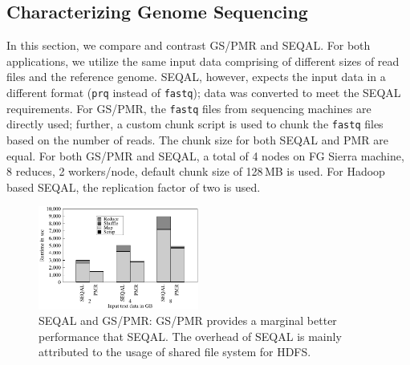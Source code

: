\documentclass{acm_proc_article-sp}
\newcommand{\jhanote}[1]{ {\textcolor{red} { ***SJ: #1 }}}
\newcommand{\alnote}[1]{ {\textcolor{blue} { ***andreL: #1 }}}
\newcommand{\pnote}[1]{ {\textcolor{magenta} { ***pradeep: #1 }}}
\newcommand{\alnote}[1]{}
\newcommand{\pnote}[1]{}
\newcommand{\jhanote}[1]{}
\newcommand{\upp}{\vspace*{-0.5em}}
\begin{document}

\upp\upp
\subsection{Characterizing Genome Sequencing}

In this section, we compare and contrast GS/PMR and SEQAL. For both
applications, we utilize the same input data comprising of different
sizes of read files and the reference genome. SEQAL, however, expects
the input data in a different format (\texttt{prq} instead of
\texttt{fastq}); data was converted to meet the SEQAL
requirements. For GS/PMR, the \texttt{fastq}
files from sequencing machines are directly used; further, a custom
chunk script is used to chunk the \texttt{fastq} files based on the number of
reads. The chunk size for both SEQAL and PMR are equal. For both
GS/PMR and SEQAL, a total of 4 nodes on FG Sierra machine, 8
reduces, 2 workers/node, default chunk size of 128\,MB is used. For
Hadoop based SEQAL, the replication factor of two is used.  


\begin{figure}[ht]
	\centering
		\includegraphics[width=0.47\textwidth]{figures/gs_seq_pmr.pdf}
\caption{SEQAL and GS/PMR: GS/PMR provides a marginal better
  performance that SEQAL. The overhead of SEQAL is mainly attributed
  to the usage of shared file system for HDFS.\upp}
\label{fig:gs_seq_pmr}
\end{figure}		
\end{document}
